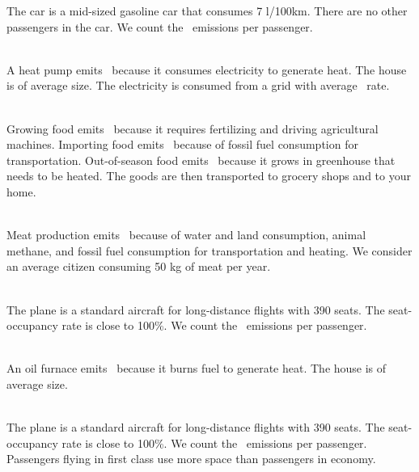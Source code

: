 \begin{enumerateb}
	The car is a mid-sized gasoline car that consumes 7 l/100km.
	There are no other passengers in the car.
	We count the \COtwo\ emissions per passenger. \\
	\item {} \\
	A heat pump emits \COtwo\ because it consumes electricity to generate heat.
	The house is of average size.
	The electricity is consumed from a grid with average \COtwo\ rate. \\
	\item {} \\
	Growing food emits \COtwo\  because it requires fertilizing and driving agricultural machines.
	Importing food emits \COtwo\ because of fossil fuel consumption for transportation.
	Out-of-season food emits \COtwo\ because it grows in greenhouse that needs to be heated.
	The goods are then transported to grocery shops and to your home. \\
	\item {} \\
	Meat production emits \COtwo\ because of water and land consumption, animal methane, and fossil fuel consumption for transportation and heating.
	We consider an average citizen consuming 50 kg of meat per year. \\
	\item {} \\
	The plane is a standard aircraft for long-distance flights with 390 seats.
	The seat-occupancy rate is close to 100\%.
	We count the \COtwo\ emissions per passenger. \\
	\item {} \\
	An oil furnace emits \COtwo\ because it burns fuel to generate heat.
	The house is of average size. \\
	\item {} \\
	The plane is a standard aircraft for long-distance flights with 390 seats.
	The seat-occupancy rate is close to 100\%.
	We count the \COtwo\ emissions per passenger.
	Passengers flying in first class use more space than passengers in economy. \\
\end{enumerateb}
